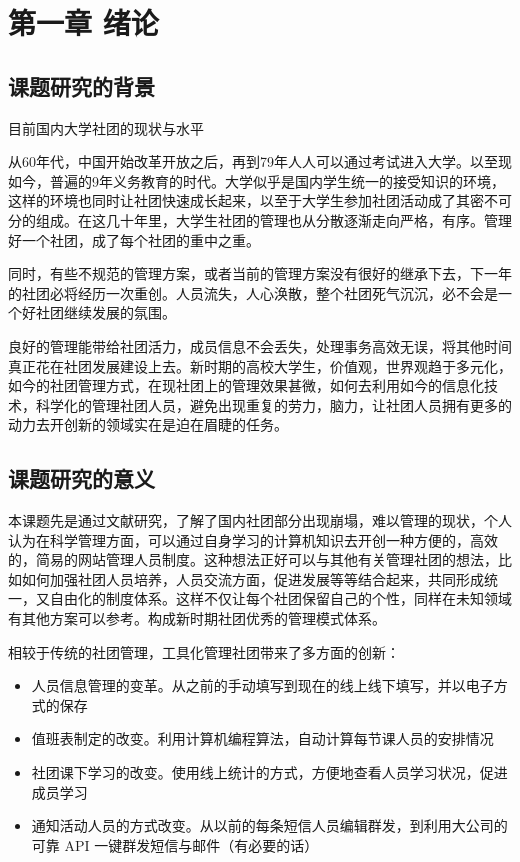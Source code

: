 \chapter{第一章 绪论}
\label{cha:overview}

\section{课题研究的背景}
\label{sec:requirements}

目前国内大学社团的现状与水平

从60年代，中国开始改革开放之后，再到79年人人可以通过考试进入大学。以至现如今，普遍的9年义务教育的时代。大学似乎是国内学生统一的接受知识的环境，这样的环境也同时让社团快速成长起来，以至于大学生参加社团活动成了其密不可分的组成。在这几十年里，大学生社团的管理也从分散逐渐走向严格，有序。管理好一个社团，成了每个社团的重中之重。

同时，有些不规范的管理方案，或者当前的管理方案没有很好的继承下去，下一年的社团必将经历一次重创。人员流失，人心涣散，整个社团死气沉沉，必不会是一个好社团继续发展的氛围。

良好的管理能带给社团活力，成员信息不会丢失，处理事务高效无误，将其他时间真正花在社团发展建设上去。新时期的高校大学生，价值观，世界观趋于多元化，如今的社团管理方式，在现社团上的管理效果甚微，如何去利用如今的信息化技术，科学化的管理社团人员，避免出现重复的劳力，脑力，让社团人员拥有更多的动力去开创新的领域实在是迫在眉睫的任务。

\section{课题研究的意义}
\label{sec:requirements}

本课题先是通过文献研究，了解了国内社团部分出现崩塌，难以管理的现状，个人认为在科学管理方面，可以通过自身学习的计算机知识去开创一种方便的，高效的，简易的网站管理人员制度。这种想法正好可以与其他有关管理社团的想法，比如如何加强社团人员培养，人员交流方面，促进发展等等结合起来，共同形成统一，又自由化的制度体系。这样不仅让每个社团保留自己的个性，同样在未知领域有其他方案可以参考。构成新时期社团优秀的管理模式体系。

相较于传统的社团管理，工具化管理社团带来了多方面的创新：

\begin{itemize}
  \item 人员信息管理的变革。从之前的手动填写到现在的线上线下填写，并以电子方式的保存
  \item 值班表制定的改变。利用计算机编程算法，自动计算每节课人员的安排情况
  \item 社团课下学习的改变。使用线上统计的方式，方便地查看人员学习状况，促进成员学习
  \item 通知活动人员的方式改变。从以前的每条短信人员编辑群发，到利用大公司的可靠 API 一键群发短信与邮件（有必要的话）
\end{itemize}

